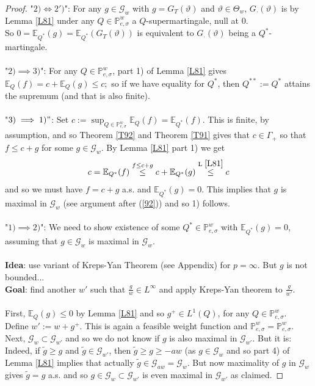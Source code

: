 \documentclass[12pt,a4paper, twoside]{article}
\theoremstyle{definition}
\newcommand{\EE}{\mathbb{E}} %
\newcommand{\PP}{\mathbb{P}} %
\begin{document}
\begin{proof}
"$2) \iff 2')$": For any $g \in \mathcal{G}_w$ with $g= G_T( \vartheta)$ and $\vartheta \in \Theta_w$, $G_\cdot( \vartheta)$ is by Lemma \ref{L81} under any $Q \in \PP_{e, \sigma}^w$ a $Q$-supermartingale, null at $0$. \\ So $ 0 = \EE_{Q^*}(g)= \EE_{Q^*}(G_T( \vartheta))$ is equivalent to $G_\cdot( \vartheta)$ being a $Q^*$-martingale. 
\\\\
"$2) \implies 3)$": For any $Q \in \PP_{e, \sigma}^w$, part 1) of Lemma \ref{L81} gives $\EE_Q(f) = c + \EE_Q(g) \leq c;$ so if we have equality for $Q^*$, then $Q^{**}:= Q^*$ attains the supremum (and that is also finite). 
\\\\ 
"$3) \implies 1)"$: Set $c:= \sup_{Q \in \PP_{e, \sigma}^w} \EE_Q(f)= \EE_{Q^*}(f)$. This is finite, by assumption, and so Theorem \ref{T92} and Theorem \ref{T91} gives that $c \in \Gamma_+$ so that $f \leq c + g$ for some $g \in \mathcal{G}_w$. By Lemma \ref{L81} part 1) we get 
\begin{align*}
c= \EE_{Q^*}(f) \overset{f \leq c+g}\leq c + \EE_{Q^*}(g) \overset{\text{L } \ref{L81}}\leq c
\end{align*}
and so we must have $f= c+g$ a.s. and $\EE_{Q^*}(g) =0$. This implies that $g$ is maximal in $\mathcal{G}_w$ (see argument after (\ref{92})) and so 1) follows. 
\\\\
"$1) \implies 2)$": We need to show existence of some $Q^* \in \PP_{e, \sigma}^w$ with $\EE_{Q^*}(g)=0$, assuming that $g \in \mathcal{G}_w$ is maximal in $\mathcal{G}_w$. \\\\
\textbf{Idea}: use variant of Kreps-Yan Theorem (see Appendix) for $p= \infty$. But $g$ is not bounded...
\\
\textbf{Goal}: find another $w'$ such that $\frac{g}{w} \in L^\infty$ and apply Kreps-Yan theorem to $\frac{g}{w'}.$
\\\\
First, $\EE_Q(g) \leq 0$ by Lemma \ref{L81} and so $g^+ \in L^1(Q)$, for any $Q \in \PP_{e, \sigma}^w$. Define $w' := w+g^+$. This is again a feasible weight function and $\PP_{e,  \sigma}^w= \PP_{e, \sigma}^w$. Next, $\mathcal{G}_w \subset \mathcal{G}_{w'}$ and so we do not know if $g$ is also maximal in $\mathcal{G}_{w'}$. But it is: Indeed, if $\widetilde{g} \geq g$ and $\widetilde{g} \in \mathcal{G}_{w'}$, then $\widetilde{g} \geq g \geq -aw$ (as $g \in \mathcal{G}_w$ and so part 4) of Lemma \ref{L81} implies that actually $\widetilde{g} \in \mathcal{G}_{aw} = \mathcal{G}_w$. But now maximality of $g$ in $\mathcal{G}_w$ gives $\widetilde{g} = g$ a.s. and so $g \in \mathcal{G}_w \subset \mathcal{G}_{w'}$ is even maximal in $\mathcal{G}_{w'}$ as claimed. 

\end{proof}
\end{document}
